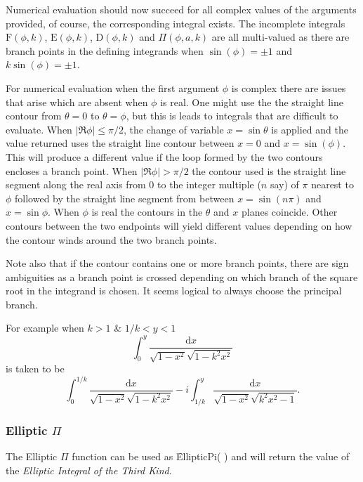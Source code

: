 Numerical evaluation should now succeed for all complex values of the arguments
provided, of course, the corresponding integral exists. The incomplete integrals
$\mathrm{F}(\phi, k)$, $\mathrm{E}(\phi, k)$, $\mathrm{D}(\phi, k)$ and
$\Pi(\phi, a, k)$ are all multi-valued as there are branch points in the
defining integrands  when $\sin(\phi) =\pm 1$ and $k\sin(\phi) = \pm 1$.

For numerical evaluation when the first argument $\phi$ is complex there are issues that
arise which are absent when $\phi$ is real. One might use the the straight line contour
from $\theta=0$ to $\theta=\phi$, but this is leads to integrals that are difficult to
evaluate. When $|\Re{\phi}| \leq \pi/2$, the change of variable $x=\sin \theta$ is applied
and the value returned uses the straight line contour between $x=0$ and $x=\sin(\phi)$.
This will  produce a different value if the loop formed by the two contours encloses a
branch point. When $|\Re{\phi}| > \pi/2$ the contour used is the straight line segment
along the real axis from 0 to the integer multiple ($n$ say) of $\pi$ nearest to $\phi$ followed
by the straight line segment from between $x=\sin(n\pi)$ and $x=\sin \phi$. When $\phi$ is real the
contours in the $\theta$ and $x$ planes coincide. Other contours between the
two endpoints will yield different values depending on how the contour winds around the
two branch points.

Note also that if the contour contains one or more  branch points, there are sign ambiguities as a
branch point is crossed depending on which branch of the square root in the integrand is
chosen. It seems logical to always choose the principal branch.

For example when $k>1$ \& $1/k < y <1$
\[ \int_0^y \frac{\mathrm{d}x}{\sqrt{1-x^2}\sqrt{1-k^2x^2}}\]
is taken to be
\[\int_0^{1/k} \frac{\mathrm{d}x}{\sqrt{1-x^2}\sqrt{1-k^2x^2}}
-i\int_{1/k}^y \frac{\mathrm{d}x}{\sqrt{1-x^2}\sqrt{k^2x^2-1}}.\]

\subsubsection{Elliptic $\Pi$}
\hypertarget{operator:ELLIPTICPI}{}
The Elliptic $\Pi$ function can be used as \f{EllipticPi( )} and
will return the value of the \emph{Elliptic Integral of the
Third Kind}.

